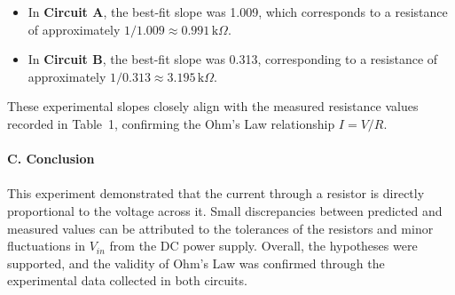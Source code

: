 \documentclass[12pt]{article}
\begin{document}
\begin{itemize}
    \item In \textbf{Circuit A}, the best-fit slope was 1.009, which corresponds to a resistance of approximately 
    $1/1.009 \approx 0.991\,\text{k}\Omega$.
    
    \item In \textbf{Circuit B}, the best-fit slope was 0.313, corresponding to a resistance of approximately 
    $1/0.313 \approx 3.195\,\text{k}\Omega$.
\end{itemize}
These experimental slopes closely align with the measured resistance values recorded in Table~1, confirming the Ohm's Law relationship $I = V/R$.\\\\
\textbf{C. Conclusion}\\\\
This experiment demonstrated that the current through a resistor is directly proportional to the voltage across it. Small discrepancies between predicted and measured values can be attributed to the tolerances of the resistors and minor fluctuations in $V_{in}$ from the DC power supply. Overall, the hypotheses were supported, and the validity of Ohm’s Law was confirmed through the experimental data collected in both circuits.
\end{document}
